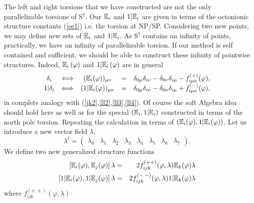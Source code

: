 \documentclass[a4paper,12pt]{book}
\begin{document}
The left and right torsions that we have constructed are not the only
parallelizable torsions of S$^{7}$. Our $\Bbb{E}_{i}$ and $1|\Bbb{E}_{i}$
are given in terms of the octonionic structure constants (\ref{ee1}) i.e.
the torsion at NP/SP. Considering two new points, we may define new sets of $%
\Bbb{E}_{i}$ and $1|\Bbb{E}_{i}$. As S$^{7}$ contains an infinity of points,
practically, we have an infinity of parallelizable torsion. If our method is
self contained and sufficient, we should be able to construct these infinity
of pointwise structures. Indeed, $\Bbb{E}_{i}\left( \varphi \right) $ and $1|%
\Bbb{E}_{i}\left( \varphi \right) $ are in general 
\begin{equation}
\begin{array}{ccccc}
\delta _{i} & \Longleftrightarrow & (\Bbb{E}_{i}(\varphi ))_{\mu \nu } & = & 
\delta _{0\mu }\delta _{i\nu }-\delta _{0\nu }\delta _{i\mu }-f_{i\mu \nu
}^{\left( +\right) }(\varphi ), \\ 
1|\delta _{i} & \Longleftrightarrow & (1|\Bbb{E}_{i}(\varphi ))_{\mu \nu } & 
= & \delta _{0\mu }\delta _{i\nu }-\delta _{0\nu }\delta _{i\mu }+f_{i\mu
\nu }^{\left( -\right) }(\varphi ),
\end{array}
\label{octon}
\end{equation}
in complete analogy with (\ref{jk2},\ref{ll2},\ref{ll3},\ref{ll4}). Of
course the soft Algebra idea should hold here as well as for the special $%
\left( \Bbb{E}_{i},1|\Bbb{E}_{i}\right) $ constructed in terms of the north
pole torsion. Repeating the calculation in terms of $\left( \Bbb{E}%
_{i}(\varphi ),1|\Bbb{E}_{i}(\varphi )\right) $. Let us introduce a new
vector field $\lambda $, 
\begin{equation}
\lambda ^{t}=\left( 
\begin{array}{llllllll}
\lambda _{0} & \lambda _{1} & \lambda _{2} & \lambda _{3} & \lambda _{4} & 
\lambda _{5} & \lambda _{6} & \lambda _{7}
\end{array}
\right) .
\end{equation}
We define two new generalized structure functions 
\begin{eqnarray}
\left[ \Bbb{E}_{i}(\varphi ),\Bbb{E}_{j}(\varphi )\right] \lambda
&=&2f_{ijk}^{(++)}(\varphi ,\lambda )\Bbb{E}_{k}(\varphi )\lambda \\
\left[ 1|\Bbb{E}_{i}(\varphi ),1|\Bbb{E}_{j}(\varphi )\right] \lambda
&=&2f_{ijk}^{(-\;-)}(\varphi ,\lambda )1|\Bbb{E}_{k}(\varphi )\lambda
\end{eqnarray}
where $f_{ijk}^{\left( \pm \;\pm \right) }\left( \varphi ,\lambda \right) $
\end{document}
